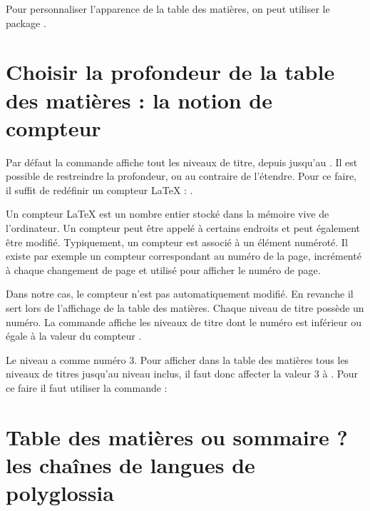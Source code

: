 \begin{plusloins}

Pour personnaliser l'apparence de la table des matières, on peut utiliser le package . 
\end{plusloins}

\section[Choix de la profondeur]{Choisir la profondeur de la table des matières : la notion de compteur}\label{tocdepth}

Par défaut la commande  affiche tout les niveaux de titre, depuis  jusqu'au . Il est possible de restreindre la profondeur, ou au contraire de l'étendre. Pour ce faire, il suffit de redéfinir un compteur \LaTeX{} : .

Un compteur \LaTeX{} est un nombre entier stocké dans la mémoire vive de l'ordinateur. Un compteur peut être appelé à certains endroits et peut également être modifié. Typiquement, un compteur est associé à un élément numéroté. Il existe par exemple un compteur  correspondant au numéro de la page, incrémenté  à chaque changement de page et utilisé pour afficher le numéro de page.\label{compteur}

Dans notre cas, le compteur  n'est pas automatiquement modifié. En revanche il sert lors de l'affichage de la table des matières. Chaque niveau de titre possède un numéro. La commande  affiche les niveaux de titre dont le numéro est inférieur ou égale à la valeur du compteur .

Le niveau  a comme numéro 3. Pour afficher dans la table des matières tous les niveaux de titres jusqu'au niveau  inclus, il faut donc affecter la valeur 3 à  . Pour ce faire il faut utiliser la commande  :

\begin{latexcode}
\setcounter{tocdepth}{3}
\tableofcontents
\end{latexcode}

\section[Table des matières ou sommaire ?]{Table des matières ou sommaire ? les chaînes de langues de polyglossia}

